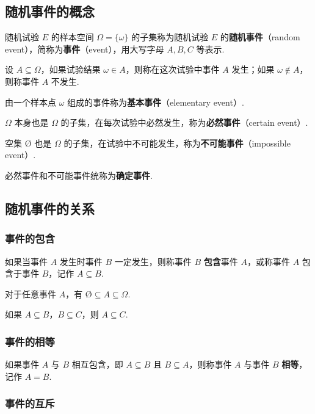 \subsection{随机事件的概念}

随机试验 $E$ 的样本空间 $\varOmega = \{ \omega \}$ 的子集称为随机试验 $E$ 的\textbf{随机事件}（random event），简称为\textbf{事件}（event），用大写字母 $A,B,C$ 等表示.

设 $A \subseteq \varOmega$，如果试验结果 $\omega \in A$，则称在这次试验中事件 $A$ 发生；如果 $\omega \notin A$，则称事件 $A$ 不发生.

由一个样本点 $\omega$ 组成的事件称为\textbf{基本事件}（elementary event）.

$\varOmega$ 本身也是 $\varOmega$ 的子集，在每次试验中必然发生，称为\textbf{必然事件}（certain event）.

空集 $\text{\O}$ 也是 $\varOmega$ 的子集，在试验中不可能发生，称为\textbf{不可能事件}（impossible event）.

必然事件和不可能事件统称为\textbf{确定事件}.

\subsection{随机事件的关系}

\subsubsection{事件的包含}

如果当事件 $A$ 发生时事件 $B$ 一定发生，则称事件 $B$ \textbf{包含}事件 $A$，或称事件 $A$ 包含于事件 $B$，记作 $A \subseteq B$.

\begin{property}
    \indent 对于任意事件 $A$，有 $\text{\O} \subseteq A \subseteq \varOmega$.
\end{property}

\begin{property}
    \indent 如果 $A \subseteq B$，$B \subseteq C$，则 $A\subseteq C$.
\end{property}

\subsubsection{事件的相等}

如果事件 $A$ 与 $B$ 相互包含，即 $A \subseteq B$ 且 $B \subseteq A$，则称事件 $A$ 与事件 $B$ \textbf{相等}，记作 $A=B$.

\subsubsection{事件的互斥}


